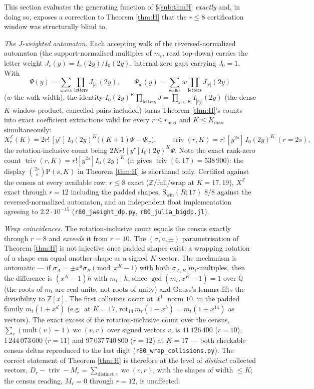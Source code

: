 \documentclass[11pt,reqno]{amsart}
\theoremstyle{definition}
\newcommand{\ZZ}{\mathbb{Z}}
\begin{document}
This section evaluates the generating function of \S\ref{sub:thmH} \emph{exactly} and, in doing
so, exposes a correction to Theorem \ref{thm:H} that the $r\le8$
certification window was structurally blind to.

\emph{The $J$-weighted automaton.}  Each accepting walk of the
reversed-normalized automaton (the support-normalised multiples of
$m_t$, read top-down) carries the letter weight
$J_c(y)=I_c(2y)/I_0(2y)$, internal zero gaps carrying $J_0=1$.  With
\[
  \Psi(y)=\sum_{\text{walks}}\prod_{\text{letters}}J_{|c|}(2y),
  \qquad
  \Psi_w(y)=\sum_{\text{walks}} w\prod_{\text{letters}}J_{|c|}(2y)
\]
($w$ the walk width), the identity
$I_0(2y)^K\prod_{\text{letters}}J=\prod_{j<K}I_{|c_j|}(2y)$ (the dense
$K$-window product, cancelled pairs included) turns Theorem \ref{thm:H}'s
counts into exact coefficient extractions valid for every $r\le r_{\max}$
and $K\le K_{\max}$ simultaneously:
\[
  X^{\ZZ}_r(K)=2r!\,[y^r]\,I_0(2y)^K\bigl((K{+}1)\Psi-\Psi_w\bigr),
  \qquad
  \operatorname{triv}(r,K)=r!\,[y^{2s}]\,I_0(2y)^K\ (r=2s),
\]
the rotation-inclusive count being $2Kr!\,[y^r]I_0(2y)^K\Psi$.  Note the
exact rank-zero count $\operatorname{triv}(r,K)=r![y^{2s}]I_0(2y)^K$ (it
gives $\operatorname{triv}(6,17)=538\,900$): the display
$\binom{2s}{s}\mathrm P(s,K)$ in Theorem \ref{thm:H} is shorthand only.
Certified against the census at every available row: $r\le8$ exact
($\ZZ$/full/wrap at $K=17,19$), $X^{\ZZ}$ exact through $r=12$ including
the padded shapes, $\mathrm S_{\mathrm{win}}(R;17)$ $8/8$ against the
reversed-normalized automaton, and an independent float implementation agreeing to
$2.2\cdot10^{-15}$ (\texttt{r80\_jweight\_dp.py}, \texttt{r80\_julia\_bigdp.jl}).

\emph{Wrap coincidences.}  The rotation-inclusive count equals the census
exactly through $r=8$ and \emph{exceeds} it from $r=10$.  The
$(\sigma,a,\pm)$ parametrisation of Theorem \ref{thm:H} is not injective
once padded shapes exist: a wrapping rotation of a shape can equal another
shape as a signed $K$-vector.  The mechanism is automatic --- if
$\sigma_A=\pm x^a\sigma_B \pmod{x^K-1}$ with both $\sigma_{A,B}$
$m_t$-multiples, then the difference is $(x^K-1)h$ with $m_t\mid h$, since
$\gcd(m_t,x^K-1)=1$ over $\mathbb Q$ (the roots of $m_t$ are real units,
not roots of unity) and Gauss's lemma lifts the divisibility to
$\mathbb Z[x]$.  The first collisions occur at $\ell^1$ norm $10$, in the
padded family $m_t(1+x^d)$ (e.g.\ at $K=17$,
$\mathrm{rot}_{14}\,m_t(1+x^3)=m_t(1+x^{14})$ as vectors).  The exact
excess of the rotation-inclusive count over the census,
$\sum_v(\mathrm{mult}(v)-1)\operatorname{wc}(v,r)$ over signed vectors $v$,
is $41\,126\,400$ ($r=10$), $1\,244\,073\,600$ ($r=11$) and
$97\,037\,740\,800$ ($r=12$) at $K=17$ --- both checkable census deltas
reproduced to the last digit (\texttt{r80\_wrap\_collisions.py}).  The
correct statement of Theorem \ref{thm:H} is therefore at the level of
\emph{distinct} collected vectors,
$D_r-\operatorname{triv}-M_r=\sum_{\text{distinct }c}\operatorname{wc}(c,r)$,
with the shapes of width $\le K$; the census reading, $M_r=0$ through
$r=12$, is unaffected.
\end{document}
